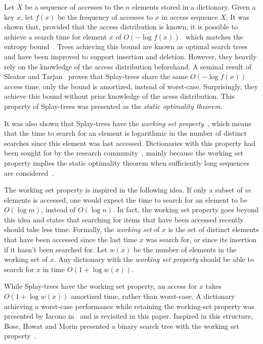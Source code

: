 \documentclass[11pt]{article}       %
\begin{document}
Let $X$ be a sequence of accesses to the $n$ elements stored in a dictionary.
Given a key $x$, let $f(x)$ be the frequency of accesses to $x$ in access sequence $X$. It was shown that, provided that the access distribution is known, it is possible to achieve a search time for element $x$ of $O(-\log f(x))$~\cite{hu1971optimal, knuth1971optimum} which matches the entropy bound~\cite{shannon1948mathematical}.
Trees achieving this bound are known as optimal search trees and have been improved to support insertion and deletion. However, they heavily rely on the knowledge of the access distribution beforehand. 
A seminal result of Sleator and Tarjan~\cite{sleator1985self} proves that Splay-trees share the same $O(-\log f(x))$ access time, only the bound is amortized, instead of worst-case. Surprisingly, they achieve this bound without prior knowledge of the acess distribution.
This property of Splay-trees was presented as the \emph{static optimality theorem}.

It was also shown that Splay-trees have the \emph{working set property}~\cite{sleator1985self}, which means that the time to search for an element is logarithmic in the number of distinct searches since this element was last accessed. 
Dictionaries with this property had been sought for by the research community~\cite{iacono2001alternatives, bose2008dynamic}, mainly 
because the working set property implies the static optimality theorem when sufficiently long sequences are considered~\cite{iacono2000improved}. 

The working set property is inspired in the following idea. If only a subset of $m$ elements is accessed, one would expect the time to search for an element to be $O(\log m)$, instead of $O(\log n)$. In fact, the working set property goes beyond this idea and states that searching for items that have been accessed recently should take less time. Formally, the \emph{working set} of $x$ is the set of distinct elements that have been accessed since the last time $x$ was search for, or since its insertion if it hasn't been searched for.
Let $w(x)$ be the number of elements in the working set of $x$. Any dictionary with the \emph{working set property} should be able to search for $x$ in time $O(1 + \log w(x))$. 


While Splay-trees have the working set property, an access for $x$ takes $O(1+\log w(x))$ amortized time, rather than worst-case. A dictionary achieving a worst-case performance while retaining the working-set property was presented by Iacono in~\cite{iacono2001alternatives} and is revisited in this paper. 
Inspired in this structure, Bose, Howat and Morin presented a binary search tree with the working set property~\cite{bose2010layered}.
\end{document}
